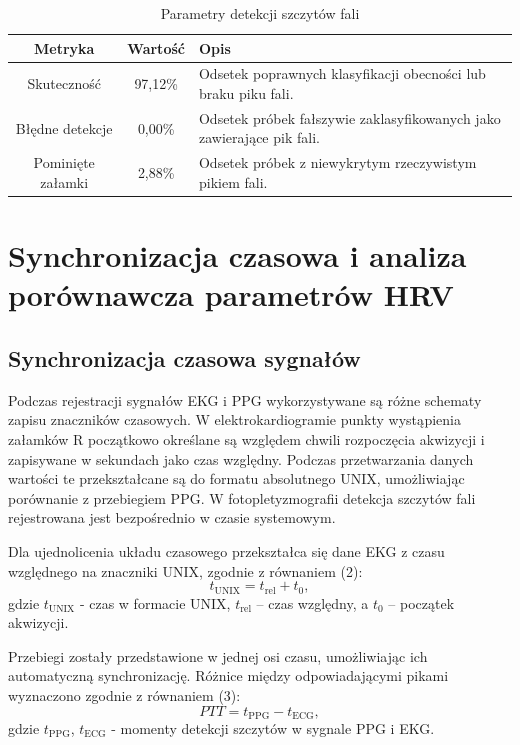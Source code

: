 \documentclass[journal]{IEEEtran}
\begin{document}
\begin{table}[ht]
\centering
\caption{Parametry detekcji szczytów fali}
\label{tab:metrics_ppg}
\begin{tabular}{|c|c|p{4.6cm}|}
\hline
\textbf{Metryka} & \textbf{Wartość} & \textbf{Opis} \\
\hline
Skuteczność & 97,12\% & Odsetek poprawnych klasyfikacji obecności lub braku piku fali. \\
\hline
Błędne detekcje & 0,00\% & Odsetek próbek fałszywie zaklasyfikowanych jako zawierające pik fali. \\
\hline
Pominięte załamki & 2,88\% & Odsetek próbek z niewykrytym rzeczywistym pikiem fali. \\
\hline
\end{tabular}
\end{table}

\section{Synchronizacja czasowa i analiza porównawcza parametrów HRV}

\subsection{Synchronizacja czasowa sygnałów}
Podczas rejestracji sygnałów EKG i PPG wykorzystywane są różne schematy zapisu znaczników czasowych. W elektrokardiogramie punkty wystąpienia załamków R początkowo określane są względem chwili rozpoczęcia akwizycji i zapisywane w sekundach jako czas względny. Podczas przetwarzania danych wartości te przekształcane są do formatu absolutnego UNIX, umożliwiając porównanie z przebiegiem PPG. W fotopletyzmografii detekcja szczytów fali rejestrowana jest bezpośrednio w czasie systemowym.

Dla ujednolicenia układu czasowego przekształca się dane EKG z czasu względnego na znaczniki UNIX, zgodnie z równaniem (2):
\begin{equation}
t_{\mathrm{UNIX}} = t_{\mathrm{rel}} + t_{0},
\end{equation}
gdzie $t_{\mathrm{UNIX}}$ - czas w formacie UNIX, $t_{\mathrm{rel}}$ – czas względny, a $t_{0}$ – początek akwizycji.

Przebiegi zostały przedstawione w jednej osi czasu, umożliwiając ich automatyczną synchronizację. Różnice między odpowiadającymi pikami wyznaczono zgodnie z równaniem (3):
\begin{equation}
PTT = t_{\mathrm{PPG}} - t_{\mathrm{ECG}},
\end{equation}
gdzie $t_{\mathrm{PPG}}$, $t_{\mathrm{ECG}}$ - momenty detekcji szczytów w sygnale PPG i EKG. 
\end{document}
